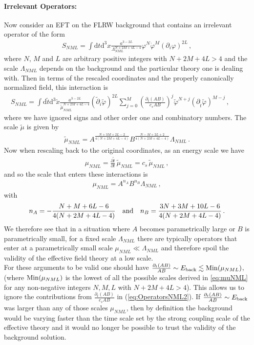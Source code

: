 \documentclass[12pt]{article}
\def\ba{\begin{eqnarray}}
\def\ea{\end{eqnarray}}
\def\d{\mathrm{d}}
\def\({\left(}
\def\){\right)}
\def\p{\partial}
\def\p{\partial}
\begin{document}
\paragraph{Irrelevant Operators:}
Now consider an EFT on the FLRW background that contains an irrelevant operator of the form
\ba
\label{eq:OperatorsNML}
S_{NML} = \int \d t \d^3 x  \frac{a^{3-2L}}{\Lambda_{NML}^{N+2M+4L-4}} \varphi^N \dot \varphi^M (\p_i \varphi)^{2L}\,,
\ea
where  $N$, $M$ and $L$ are arbitrary positive integers with $N+2M+4L> 4$ and the scale $\Lambda_{NML}$ depends on the background and the particular theory one is dealing with.
 Then in terms of the rescaled coordinates and the properly canonically normalized field, this interaction is
\ba
\label{eq:OperatorsNML2}
S_{NML} = \int \d \tilde t \d^3 \tilde x \frac{ a^{3-2L}}{\tilde \mu_{NML}^{N+2M+4L-4}} (\tilde\p_i \tilde \varphi)^{2L} \sum_{j=0}^M \(\frac{\p_{t}(AB)}{c_s AB}\)^j \tilde\varphi^{N+j} \(\p_{\tilde t}\tilde \varphi\)^{M-j} \,,\qquad
\ea
where we have ignored signs and other order one and combinatory numbers. The scale $\tilde \mu$ is given by
\ba
\tilde \mu_{NML}= A^{\frac{N+3M+2L-2}{4(N+2M+4L-4)}} B^{\frac{N-M+2L+2}{4(N+2M+4L-4)}} \Lambda_{NML} \,.
\ea
Now when rescaling back to the original coordinates, as an energy scale we have
\ba
\mu_{NML} = \frac{\p \tilde t}{\p t} \, \tilde \mu_{NML}= c_s\,  \tilde{\mu}_{NML}\,,
\ea
and so the scale that enters these interactions is
\ba
\label{eq:muNML}
\mu_{NML}=A^{n_A} B^{n_B} \Lambda_{NML} \,,
\ea
with
\ba
\label{eq:nAnB}
n_A = - \frac{N+M+6L-6}{4(N+2M+4L-4)} \quad {\rm and}\quad  n_B =  \frac{3N+3M+10L-6}{4(N+2M+4L-4)}\,.
\ea
We therefore see that in a situation where $A$ becomes parametrically large or $B$ is parametrically small, for a fixed scale $\Lambda_{NML}$ there are typically operators that enter at a parametrically small scale $\mu_{NML}\ll \Lambda_{NML}$ and therefore spoil the validity of the effective field theory at a low scale. \\

For these arguments to be valid one should have $\frac{\p_{t}(AB)}{AB}\sim E_{\rm back} \lesssim {\rm Min}(\mu_{NML})$, (where ${\rm Min}(\mu_{NML})$ is the lowest of all the possible scales derived in \eqref{eq:muNML} for any non-negative integers $N,M,L$ with $N+2M+4L>4$). This allows us to ignore the contributions from $\frac{\p_{t}(AB)}{c_s AB}$ in (\ref{eq:OperatorsNML2}). If $\frac{\p_{t}(AB)}{ AB} \sim E_{\rm back}$ was larger than any of those scales $\mu_{NML}$, then by definition the background would be varying faster than the time scale set by the strong coupling scale of the effective theory and it would no longer be possible to trust the validity of the background solution.
\end{document}
